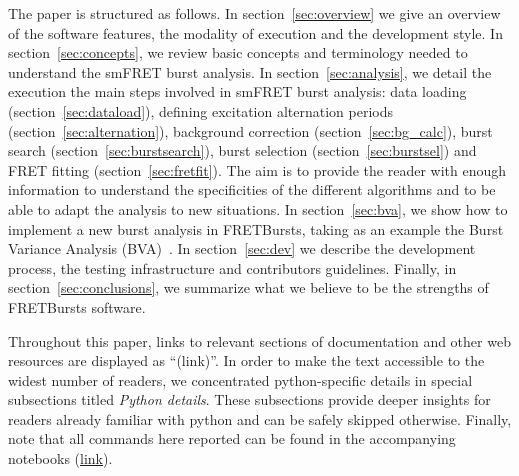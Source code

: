 The paper is structured as follows.
In section~\ref{sec:overview} we give an overview of the software features,
the modality of execution and the development style.
In section~\ref{sec:concepts}, we
review basic concepts and terminology needed
to understand the smFRET burst analysis.
In section~\ref{sec:analysis}, we detail the execution the main steps involved
in smFRET burst analysis: data loading (section~\ref{sec:dataload}), defining
excitation alternation periods (section~\ref{sec:alternation}), background
correction (section~\ref{sec:bg_calc}), burst search (section~\ref{sec:burstsearch}),
burst selection (section~\ref{sec:burstsel}) and FRET fitting (section~\ref{sec:fretfit}).
The aim is to provide the reader with enough information to understand the specificities of
the different algorithms and to be able to adapt the analysis to new situations.
In section~\ref{sec:bva}, we show how to implement a new burst analysis in FRETBursts,
taking as an example the Burst Variance Analysis (BVA)~\cite{Torella_2011}.
In section~\ref{sec:dev} we describe the development process, the testing infrastructure 
and contributors guidelines.
Finally, in section~\ref{sec:conclusions}, we summarize what we believe to be
the strengths of FRETBursts software.

Throughout this paper,
links to relevant sections of documentation and other web resources
are displayed as ``(link)''.
In order to make the text accessible to the widest number of readers,
we concentrated python-specific details in special subsections titled
\textit{Python details}. These subsections provide deeper insights for readers
already familiar with python and can be safely skipped otherwise. 
Finally, note that all commands here reported can be found in the 
accompanying notebooks 
(\href{https://github.com/tritemio/fretbursts_paper}{link}).

